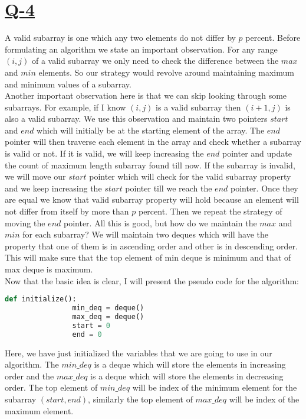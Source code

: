 \documentclass[14pt]{article}
\begin{document}
	\section*{\underline{Q-4}}
		\noindent
		A valid subarray is one which any two elements do not differ by $p$ percent. Before formulating an algorithm we state an important observation. For any range $(i, j)$ of a valid subarray we only need to check the difference between the $max$ and $min$ elements. So our strategy would revolve around maintaining maximum and minimum values of a subarray.\\
		\newline
	    Another important observation here is that we can skip looking through some subarrays. For example, if I know $(i, j)$ is a valid subarray then $(i+1, j)$ is also a valid subarray. We use this observation and maintain two pointers $start$ and $end$ which will initially be at the starting element of the array. The $end$ pointer will then traverse each element in the array and check whether a subarray is valid or not. If it is valid, we will keep increasing the $end$ pointer and update the count of maximum length subarray found till now. If the subarray is invalid, we will move our $start$ pointer which will check for the valid subarray property and we keep increasing the $start$ pointer till we reach the $end$ pointer. Once they are equal we know that valid subarray property will hold because an element will not differ from itself by more than $p$ percent. Then we repeat the strategy of moving the $end$ pointer. All this is good, but how do we maintain the $max$ and $min$ for each subarray? We will maintain two deques which will have the property that one of them is in ascending order and other is in descending order. This will make sure that the top element of min deque is minimum and that of max deque is maximum.\\
	    \newline
	    Now that the basic idea is clear, I will present the pseudo code for the algorithm:
	    
	    \begin{lstlisting}[language=Python]
	    	def initialize():
		    	min_deq = deque()
		    	max_deq = deque()
		    	start = 0
		    	end = 0
	    \end{lstlisting}
	    
	    Here, we have just initialized the variables that we are going to use in our algorithm. The $min\_deq$ is a deque which will store the elements in increasing order and the $max\_deq$ is a deque which will store the elements in decreasing order. The top element of $min\_deq$ will be index of the minimum element for the subarray $(start, end)$, similarly the top element of $max\_deq$ will be index of the maximum element.\\
	    \newpage
	    
\end{document}
